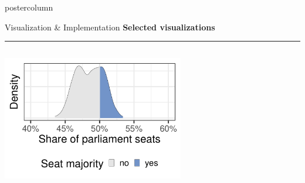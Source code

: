 \documentclass[final,hyperref={pdfpagelabels=false}]{beamer}
\newcommand{\bfBlue}[1]{\textcolor{koaladarkestblue}{\textbf{#1}}}
\begin{document}
\begin{frame}
\begin{columns}
\begin{column}{1\textwidth}
\begin{columns}[T]
\begin{column}{.484\textwidth}
\begin{beamercolorbox}[center,wd=\textwidth]{postercolumn}
\begin{minipage}[T]{.95\textwidth}
\begin{block}{\footnotesize Visualization \& Implementation}
\bfBlue{Selected visualizations}
\\[0.05cm]
\textcolor{LMUlightgray}{\hrule{}}
\vspace{1ex}
\begin{columns}[t]
  \begin{column}{.35\textwidth}
  \vspace{35px}
  \begin{center}\centering
  \includegraphics[width=300px]{figures/vis_seatDist}
  \end{center}
  \end{column}

  \hspace{-1.5ex}
  \textcolor{LMUlightgray}{\vrule{}}
  \hspace{1.5ex}


\end{columns}
\end{block}
\end{minipage}
\end{beamercolorbox}
\end{column}
\end{columns}
\end{column}
\end{columns}
\end{frame}
\end{document}
